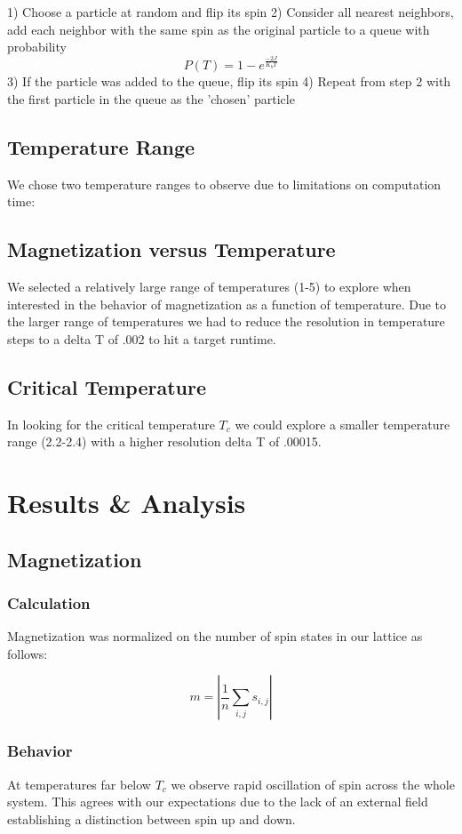 \documentclass[10pt]{article}
\newcommand{\beq}{\begin{equation}}
\newcommand{\eeq}{\end{equation}}
\begin{document}
1) Choose a particle at random and flip its spin
2) Consider all nearest neighbors, add each neighbor with the same spin as the original particle to a queue with probability
\beq
\label{eqn:equation2}
P(T)=1-e^{\frac{-2J}{K_{b}T}}
\eeq
3) If the particle was added to the queue, flip its spin
4) Repeat from step 2 with the first particle in the queue as the 'chosen' particle

\subsection{Temperature Range}
We chose two temperature ranges to observe due to limitations on computation time:

\subsection{Magnetization versus Temperature}
We selected a relatively large range of temperatures (1-5) to explore when interested in the behavior of magnetization as a function of temperature.  Due to the larger range of temperatures we had to reduce the resolution in temperature steps to a delta T of .002 to hit a target runtime.

\subsection{Critical Temperature}
In looking for the critical temperature $T_c$ we could explore a smaller temperature range (2.2-2.4) with a higher resolution delta T of .00015.

\section{Results \& Analysis}
\subsection{Magnetization}
\subsubsection{Calculation}
Magnetization was normalized on the number of spin states in our lattice as follows:

\beq
\label{eqn:equation3}
m=|\frac{1}{n}\sum\limits_{i,j} s_{i,j}|
\eeq

\subsubsection{Behavior}
At temperatures far below $T_c$ we observe rapid oscillation of spin across the whole system.  This agrees with our expectations due to the lack of an external field establishing a distinction between spin up and down.
\end{document}
